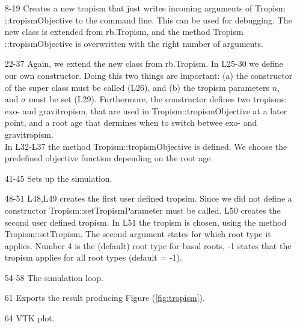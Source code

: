 \begin{itemize}

\item[8-19] Creates a new tropism that just writes incoming arguments of Tropism ::tropismObjective to the command line. This can be used for debugging. The new class is extended from rb.Tropism, and the method Tropism ::tropismObjective is overwritten with the right number of arguments.

\item[22-37] Again, we extend the new class from rb.Tropism. In L25-30 we define our own constructor. Doing this two things are important: (a) the constructor of the super class must be called (L26), and (b) the tropism parameters $n$, and $\sigma$ must be set (L29). 
Furthermore, the constructor defines two tropisms: exo- and gravitropism, that are used in Tropism::tropismObjective at a later point, and a root age that dermines when to switch betwee exo- and gravitropism. \\
In L32-L37 the method Tropism::tropismObjective is defined. We choose the predefined objective function depending on the root age.

\item[41-45] Sets up the simulation.

\item[48-51] L48,L49 creates the first user defined tropsim. Since we did not define a constructor Tropism::setTropismParameter must be called. L50 creates the second user defined tropism.  In L51 the tropism is chosen, using the method Tropism::setTropism. The second argument states for which root type it applies. 
Number 4 is the (default) root type for basal roots, -1 states that the tropism applies for all root types (default = -1).

\item[54-58] The simulation loop. 

\item [61] Exports the result producing Figure (\ref{fig:tropism}). 

\item [64] VTK plot.

\end{itemize}

